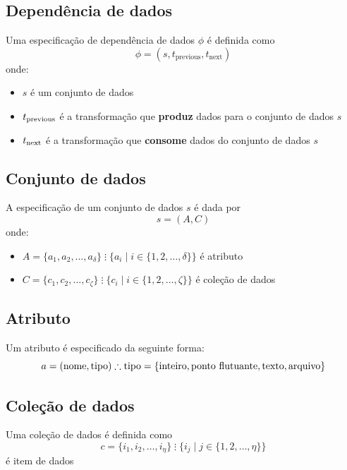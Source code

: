 
\subsection{Dependência de dados}

Uma especificação de dependência de dados \( \phi \) é definida como \[ \phi = (s, t_{\textrm{previous}}, t_{\textrm{next}}) \] onde:
\begin{itemize}
    \item \( s \) é um conjunto de dados
    \item \( t_{\textup{previous}} \) é a transformação que {\bf produz} dados para o conjunto de dados \( s \)
    \item \( t_{\textup{next}} \) é a transformação que {\bf consome} dados do conjunto de dados \( s \)
\end{itemize}

\subsection{Conjunto de dados}

A especificação de um conjunto de dados \( s \) é dada por \[ s = (A, C) \] onde:
\begin{itemize}
    \item \( A = \{a_1, a_2, \ldots, a_{\delta} \} \; \vdots{} \; \{ a_i \mid i \in \{1, 2, \ldots, \delta \} \} \) é atributo
    \item \( C = \{c_1, c_2, \ldots, c_{\zeta} \} \; \vdots{} \; \{ c_i \mid i \in \{1, 2, \ldots, \zeta \} \} \) é coleção de dados
\end{itemize}

\subsection{Atributo}

Um atributo é especificado da seguinte forma: \[ a = (\textrm{nome},\textrm{tipo}) \therefore \textrm{tipo} = \{\textup{inteiro}, \textup{ponto flutuante}, \textup{texto}, \textup{arquivo}\} \]

\subsection{Coleção de dados}

Uma coleção de dados é definida como \[ c = \{ i_1, i_2, \ldots, i_{\eta} \} \; \vdots \; \{ i_j \mid j \in \{ 1, 2, \ldots, \eta \} \} \] é item de dados

